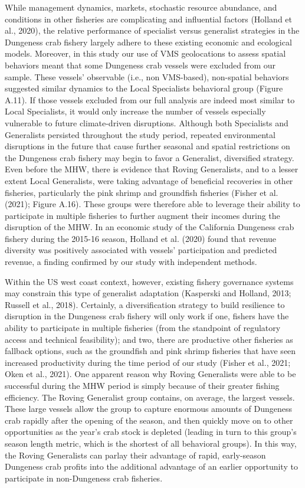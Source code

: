 \documentclass[]{elsarticle} %
\begin{document}
While management dynamics, markets, stochastic resource abundance, and
conditions in other fisheries are complicating and influential factors
(Holland et al., 2020), the relative performance of specialist versus
generalist strategies in the Dungeness crab fishery largely adhere to
these existing economic and ecological models. Moreover, in this study
our use of VMS geolocations to assess spatial behaviors meant that some
Dungeness crab vessels were excluded from our sample. These vessels'
observable (i.e., non VMS-based), non-spatial behaviors suggested
similar dynamics to the Local Specialists behavioral group (Figure
A.11). If those vessels excluded from our full analysis are indeed most
similar to Local Specialists, it would only increase the number of
vessels especially vulnerable to future climate-driven disruptions.
Although both Specialists and Generalists persisted throughout the study
period, repeated environmental disruptions in the future that cause
further seasonal and spatial restrictions on the Dungeness crab fishery
may begin to favor a Generalist, diversified strategy. Even before the
MHW, there is evidence that Roving Generalists, and to a lesser extent
Local Generalists, were taking advantage of beneficial recoveries in
other fisheries, particularly the pink shrimp and groundfish fisheries
(Fisher et al. (2021); Figure A.16). These groups were therefore able to
leverage their ability to participate in multiple fisheries to further
augment their incomes during the disruption of the MHW. In an economic
study of the California Dungeness crab fishery during the 2015-16
season, Holland et al. (2020) found that revenue diversity was
positively associated with vessels' participation and predicted revenue,
a finding confirmed by our study with independent methods.

Within the US west coast context, however, existing fishery governance
systems may constrain this type of generalist adaptation (Kasperski and
Holland, 2013; Russell et al., 2018). Certainly, a diversification
strategy to build resilience to disruption in the Dungeness crab fishery
will only work if one, fishers have the ability to participate in
multiple fisheries (from the standpoint of regulatory access and
technical feasibility); and two, there are productive other fisheries as
fallback options, such as the groundfish and pink shrimp fisheries that
have seen increased productivity during the time period of our study
(Fisher et al., 2021; Oken et al., 2021). One apparent reason why Roving
Generalists were able to be successful during the MHW period is simply
because of their greater fishing efficiency. The Roving Generalist group
contains, on average, the largest vessels. These large vessels allow the
group to capture enormous amounts of Dungeness crab rapidly after the
opening of the season, and then quickly move on to other opportunities
as the year's crab stock is depleted (leading in turn to this group's
season length metric, which is the shortest of all behavioral groups).
In this way, the Roving Generalists can parlay their advantage of rapid,
early-season Dungeness crab profits into the additional advantage of an
earlier opportunity to participate in non-Dungeness crab fisheries.
\end{document}
